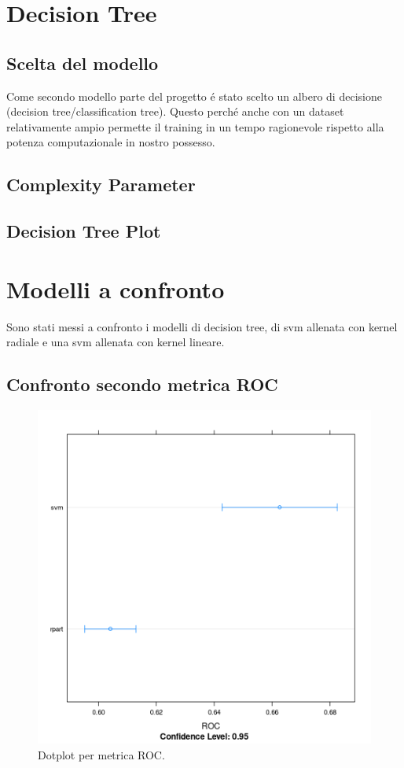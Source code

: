 \section{Decision Tree} \subsection{Scelta del modello} Come secondo
modello parte del progetto é stato scelto un albero di decisione
(decision tree/classification tree). Questo perché anche con un
dataset relativamente ampio permette il training in un tempo
ragionevole rispetto alla potenza computazionale in nostro possesso.

\subsection{Complexity Parameter}
\subsection{Decision Tree Plot}

\section{Modelli a confronto}
Sono stati messi a confronto i modelli di decision tree, di svm
allenata con kernel radiale e una svm allenata con kernel lineare.

\subsection{Confronto secondo metrica ROC}

\begin{figure}[H]
	\centering
	\includegraphics[width=13cm]{../images/compare_dot_plot_fix.png}
	\caption{Dotplot per metrica ROC.}
	\label{fig:compare_dot_plot}
\end{figure}

